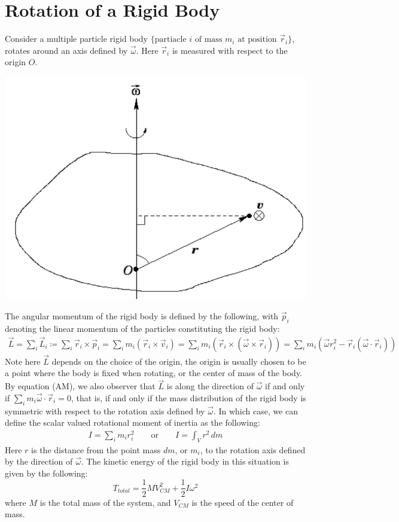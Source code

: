 \documentclass[11pt,oneside]{book}
\theoremstyle{break}
\theoremstyle{break}
\begin{document}
\section[Rotation of a Rigid Body]{\color{red}Rotation of a Rigid Body\color{black}}
Consider a multiple particle rigid body $\{\text{partiacle }i \text{ of mass }m_i \text{ at position }\vec{r}_i\}$, rotates around an axis defined by $\vec{\omega}$. Here $\vec{r}_i$ is measured with respect to the origin $O$. 
\begin{center}
\includegraphics[scale=0.65]{omega.png}
\end{center}
The angular momentum of the rigid body is defined by the following, with $\vec{p}_i$ denoting the linear momentum of the particles constituting the rigid body:
\begin{align*}
\vec{L} = \sum_i \vec{L}_i \coloneqq \sum_i \vec{r}_i \times \vec{p}_i = \sum_i m_i(\vec{r}_i \times \vec{v}_i) = \sum_i m_i \left( \vec{r}_i \times \left(\vec{\omega}\times \vec{r}_i\right)\right) = \sum_i m_i \left( \vec{\omega}r_i^2 - \vec{r}_i \left( \vec{\omega} \cdot \vec{r}_i\right) \right) \tag{AM}
\end{align*}
Note here $\vec{L}$ depends on the choice of the origin, the origin is usually chosen to be a point where the body is fixed when rotating, or the center of mass of the body. \\

By equation (AM), we also observer that $\vec{L}$ is along the direction of $\vec{\omega}$ if and only if $\sum_i m_i\vec{\omega}\cdot \vec{r}_i = 0$, that is, if and only if the mass distribution of the rigid body is symmetric with respect to the rotation axis defined by $\vec{\omega}$. In which case, we can define the scalar valued rotational moment of inertia as the following:
\begin{align*}
I = \sum_i m_i r_i^2 \qquad\text{or} \qquad I = \int_V r^2\, dm
\end{align*}
Here $r$ is the distance from the point mass $dm$, or $m_i$, to the rotation axis defined by the direction of $\vec{\omega}$. The kinetic energy of the rigid body in this situation is given by the following:
$$T_{total} = \frac{1}{2}MV^2_{CM} + \frac{1}{2}I \omega^2$$
where $M$ is the total mass of the system, and $V_{CM}$ is the speed of the center of mass.\\
\end{document}
